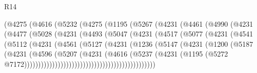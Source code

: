 \begin{lexlean}{R14}
\begin{coremodule}
                    (@4275
                      (@4616
                        (@5232
                          (@4275
                            (@1195
                              (@5267
                                (@4231
                                  (@4461
                                    (@4990
                                      (@4231
                                        (@4477
                                          (@5028
                                            (@4231
                                              (@4493
                                                (@5047
                                                  (@4231
                                                    (@4517
                                                      (@5077
                                                        (@4231
                                                          (@4541
                                                            (@5112
                                                              (@4231
                                                                (@4561
                                                                  (@5127
                                                                    (@4231
                                                                      (@1236
                                                                        (@5147
                                                                          (@4231
                                                                            (@1200
                                                                              (@5187
                                                                                (@4231
                                                                                  (@4596
                                                                                    (@5207
                                                                                      (@4231
                                                                                        (@4616
                                                                                          (@5237
                                                                                            (@4231
                                                                                              (@1195
                                                                                                (@5272
                                                                                                  @7172)))))))))))))))))))))))))))))))))))))))))))))))

\end{coremodule}
\end{lexlean}
